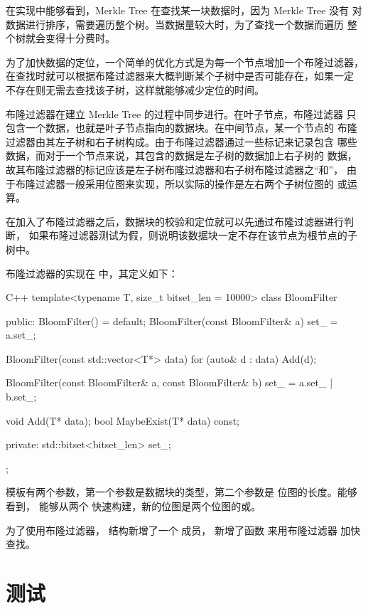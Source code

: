 \documentclass{mydoc}
\begin{document}
在实现中能够看到，Merkle Tree 在查找某一块数据时，因为 Merkle Tree 没有
对数据进行排序，需要遍历整个树。当数据量较大时，为了查找一个数据而遍历
整个树就会变得十分费时。

为了加快数据的定位，一个简单的优化方式是为每一个节点增加一个布隆过滤器，
在查找时就可以根据布隆过滤器来大概判断某个子树中是否可能存在，如果一定
不存在则无需去查找该子树，这样就能够减少定位的时间。

布隆过滤器在建立 Merkle Tree 的过程中同步进行。在叶子节点，布隆过滤器
只包含一个数据，也就是叶子节点指向的数据块。在中间节点，某一个节点的
布隆过滤器由其左子树和右子树构成。由于布隆过滤器通过一些标记来记录包含
哪些数据，而对于一个节点来说，其包含的数据是左子树的数据加上右子树的
数据，故其布隆过滤器的标记应该是左子树布隆过滤器和右子树布隆过滤器之``和''，
由于布隆过滤器一般采用位图来实现，所以实际的操作是左右两个子树位图的
或运算。

在加入了布隆过滤器之后，数据块的校验和定位就可以先通过布隆过滤器进行判断，
如果布隆过滤器测试为假，则说明该数据块一定不存在该节点为根节点的子树中。

布隆过滤器的实现在  中，其定义如下：

\begin{codes}{C++}
template<typename T, size_t bitset_len = 10000>
class BloomFilter {
 public:
  BloomFilter() = default;
  BloomFilter(const BloomFilter& a) { set_ = a.set_; }

  BloomFilter(const std::vector<T*> data) {
    for (auto& d : data)
      Add(d);
  }

  BloomFilter(const BloomFilter& a, const BloomFilter& b) {
    set_ = a.set_ | b.set_;
  }

  void Add(T* data);
  bool MaybeExist(T* data) const;

 private:
  std::bitset<bitset_len> set_;
};
\end{codes}

 模板有两个参数，第一个参数是数据块的类型，第二个参数是
位图的长度。能够看到， 能够从两个 
快速构建，新的位图是两个位图的或。

为了使用布隆过滤器， 结构新增了一个 
成员， 新增了函数  来用布隆过滤器
加快查找。

\section{测试}
\end{document}
